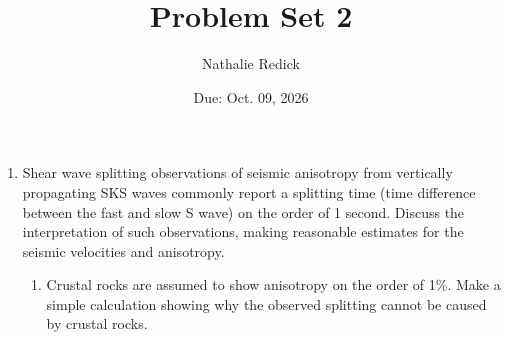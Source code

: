 \documentclass{template}
\title{\textbf{Problem Set 2}}
\author{Nathalie Redick}
\date{Due: Oct. 09, 2026}
\newcommand{\solution}[1]{%
\iftoggle{showanswers}{%
\begin{solutionbox}
        #1
\end{solutionbox}%
  }{}%
}
\begin{document}
\maketitle
\thispagestyle{fancy}

\begin{enumerate}[label=\textbf{\arabic*.}]

\item Shear wave splitting observations of seismic anisotropy from vertically propagating SKS waves commonly report a splitting time (time difference between the fast and slow S wave) on the order of 1 second. Discuss the interpretation of such observations, making reasonable estimates for the seismic velocities and anisotropy.

\begin{enumerate}[label=\Alph*)]
\item Crustal rocks are assumed to show anisotropy on the order of 1\%. Make a simple calculation showing why the observed splitting cannot be caused by crustal rocks.
\solution{
    Given that the average composition of continental crust is granitic, we can assume a shear wave velocity of the crust of 3.67 km/s (given by question 2). Using the following equation for delay time, as defined by \textcite{silverShearWaveSplitting1991,silverSeismicAnisotropyContinents1996}:

    \begin{equation}
        \delta t = L \frac{\delta\hat{\beta}}{\beta_0}
        \label{eq:delay-time}
    \end{equation}

    Where:

    \begin{itemize}
        \item $L$ = path length (through the crust)
        \item $\delta\hat{\beta}$ = dimensionless anisotropy
        \item $\beta_0$ = isotropically averaged shear velocity
    \end{itemize}

    The expected delay time for continental crust, assuming an average thickness of 40~km \parencite{mooneyCrustLithosphericStructure2015}, can be estimated as:

    \begin{align*}
        \delta t &= \qty{40}{\km} \frac{0.01}{\qty{3.67}{\km\per\s}}\\
        &\approx \qty{0.1}{\s} \ll\, \qty{1}{\s}
    \end{align*}

}
\end{enumerate}
\end{enumerate}
\end{document}
